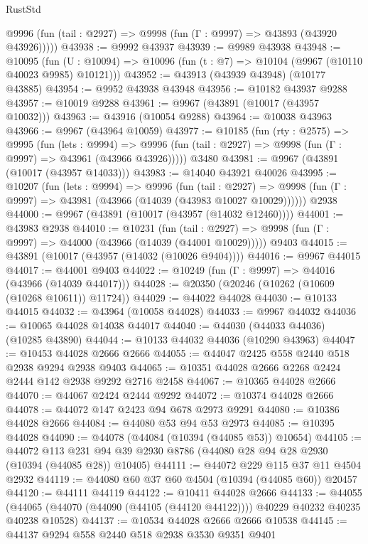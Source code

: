 \begin{lexlean}{RustStd}
\begin{coremodule}
      @9996 (fun (tail : @2927) => @9998 (fun (Γ : @9997) => @43893 (@43920 @43926)))))
@43938 := @9992 @43937
@43939 := @9989 @43938
@43948 := @10095
    (fun (U : @10094) => @10096 (fun (t : @7) => @10104 (@9967 (@10110 @40023 @9985) @10121)))
@43952 := @43913 (@43939 @43948) (@10177 @43885)
@43954 := @9952 @43938 @43948
@43956 := @10182 @43937 @9288
@43957 := @10019 @9288
@43961 := @9967 (@43891 (@10017 (@43957 @10032)))
@43963 := @43916 (@10054 @9288)
@43964 := @10038 @43963
@43966 := @9967 (@43964 @10059)
@43977 := @10185
    (fun (rty : @2575) =>
    @9995
      (fun (lets : @9994) =>
      @9996 (fun (tail : @2927) => @9998 (fun (Γ : @9997) => @43961 (@43966 @43926)))))
    @3480
@43981 := @9967 (@43891 (@10017 (@43957 @14033)))
@43983 := @14040 @43921 @40026
@43995 := @10207
    (fun (lets : @9994) =>
    @9996
      (fun (tail : @2927) =>
      @9998 (fun (Γ : @9997) => @43981 (@43966 (@14039 (@43983 @10027 @10029))))))
    @2938
@44000 := @9967 (@43891 (@10017 (@43957 (@14032 @12460))))
@44001 := @43983 @2938
@44010 := @10231
    (fun (tail : @2927) => @9998 (fun (Γ : @9997) => @44000 (@43966 (@14039 (@44001 @10029)))))
    @9403
@44015 := @43891 (@10017 (@43957 (@14032 (@10026 @9404))))
@44016 := @9967 @44015
@44017 := @44001 @9403
@44022 := @10249 (fun (Γ : @9997) => @44016 (@43966 (@14039 @44017)))
@44028 := @20350 (@20246 (@10262 (@10609 (@10268 @10611)) @11724))
@44029 := @44022 @44028
@44030 := @10133 @44015
@44032 := @43964 (@10058 @44028)
@44033 := @9967 @44032
@44036 := @10065 @44028 @14038 @44017
@44040 := @44030 (@44033 @44036) (@10285 @43890)
@44044 := @10133 @44032 @44036 (@10290 @43963)
@44047 := @10453 @44028 @2666 @2666
@44055 := @44047 @2425 @558 @2440 @518 @2938 @9294 @2938 @9403
@44065 := @10351 @44028 @2666 @2268 @2424 @2444 @142 @2938 @9292 @2716 @2458
@44067 := @10365 @44028 @2666
@44070 := @44067 @2424 @2444 @9292
@44072 := @10374 @44028 @2666
@44078 := @44072 @147 @2423 @94 @678 @2973 @9291
@44080 := @10386 @44028 @2666
@44084 := @44080 @53 @94 @53 @2973
@44085 := @10395 @44028
@44090 := @44078 (@44084 (@10394 (@44085 @53)) @10654)
@44105 := @44072
    @113
    @231
    @94
    @39
    @2930
    @8786
    (@44080 @28 @94 @28 @2930 (@10394 (@44085 @28)) @10405)
@44111 := @44072 @229 @115 @37 @11 @4504 @2932
@44119 := @44080 @60 @37 @60 @4504 (@10394 (@44085 @60)) @20457
@44120 := @44111 @44119
@44122 := @10411 @44028 @2666
@44133 := @44055
    (@44065 (@44070 (@44090 (@44105 (@44120 @44122)))) @40229 @40232 @40235 @40238 @10528)
@44137 := @10534 @44028 @2666 @2666 @10538
@44145 := @44137 @9294 @558 @2440 @518 @2938 @3530 @9351 @9401

\end{coremodule}
\end{lexlean}
